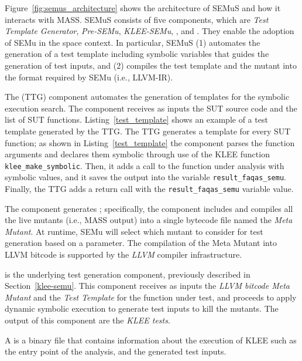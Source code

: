 

Figure~\ref{fig:semus_architecture} shows the architecture of SEMuS and how it interacts with MASS. SEMuS consists of five components, which are \emph{Test Template Generator},  \emph{Pre-SEMu},  \emph{KLEE-SEMu},  , and .
They enable the adoption of SEMu in the space context. In particular, SEMuS (1) automates the generation of a test template including symbolic variables that guides the generation of test inputs, and (2) compiles the test template and the mutant into the format required by SEMu (i.e., LLVM-IR). 


The  (TTG) component automates the generation of templates for the symbolic execution search. The component receives as inputs the SUT source code and the list of SUT functions. 
Listing~\ref{test_template} shows an example of a test template generated by the TTG. The TTG generates a template for every SUT function; as shown in Listing~\ref{test_template} the component parses the function arguments and declares them symbolic through use of the KLEE function \texttt{klee\_make\_symbolic}. Then, it adds a call to the function under analysis with symbolic values, and it saves the output into the variable \texttt{result\_faqas\_semu}. Finally, the TTG adds a return call with the \texttt{result\_faqas\_semu} variable value.

The  component generates ; specifically, the component includes and compiles all the live mutants (i.e., MASS output) into a single bytecode file named the \emph{Meta Mutant}. At runtime, SEMu will select which mutant to consider for test generation based on a parameter. The compilation of the Meta Mutant into LLVM bitcode is supported by the \emph{LLVM} compiler infrastructure. 




 is the underlying test generation component, previously described in Section~\ref{klee-semu}. This component receives as inputs the \emph{LLVM bitcode Meta Mutant} and the \emph{Test Template} for the function under test, and proceeds to apply dynamic symbolic execution to generate test inputs to kill the mutants. The output of this component are the \emph{KLEE tests}.

A  is a binary file that contains information about the execution of KLEE such as the entry point of the analysis, and the generated test inputs.


